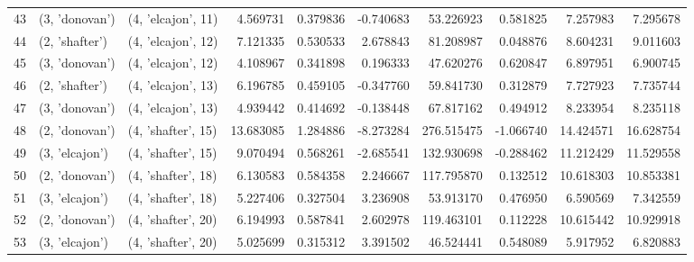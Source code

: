 \begin{tabular}{lllrrrrrrr}
43 &   (3, 'donovan') &  (4, 'elcajon', 11) &   4.569731 &   0.379836 & -0.740683 &    53.226923 &   0.581825 &   7.257983 &   7.295678 \\
44 &   (2, 'shafter') &  (4, 'elcajon', 12) &   7.121335 &   0.530533 &  2.678843 &    81.208987 &   0.048876 &   8.604231 &   9.011603 \\
45 &   (3, 'donovan') &  (4, 'elcajon', 12) &   4.108967 &   0.341898 &  0.196333 &    47.620276 &   0.620847 &   6.897951 &   6.900745 \\
46 &   (2, 'shafter') &  (4, 'elcajon', 13) &   6.196785 &   0.459105 & -0.347760 &    59.841730 &   0.312879 &   7.727923 &   7.735744 \\
47 &   (3, 'donovan') &  (4, 'elcajon', 13) &   4.939442 &   0.414692 & -0.138448 &    67.817162 &   0.494912 &   8.233954 &   8.235118 \\
48 &   (2, 'donovan') &  (4, 'shafter', 15) &  13.683085 &   1.284886 & -8.273284 &   276.515475 &  -1.066740 &  14.424571 &  16.628754 \\
49 &   (3, 'elcajon') &  (4, 'shafter', 15) &   9.070494 &   0.568261 & -2.685541 &   132.930698 &  -0.288462 &  11.212429 &  11.529558 \\
50 &   (2, 'donovan') &  (4, 'shafter', 18) &   6.130583 &   0.584358 &  2.246667 &   117.795870 &   0.132512 &  10.618303 &  10.853381 \\
51 &   (3, 'elcajon') &  (4, 'shafter', 18) &   5.227406 &   0.327504 &  3.236908 &    53.913170 &   0.476950 &   6.590569 &   7.342559 \\
52 &   (2, 'donovan') &  (4, 'shafter', 20) &   6.194993 &   0.587841 &  2.602978 &   119.463101 &   0.112228 &  10.615442 &  10.929918 \\
53 &   (3, 'elcajon') &  (4, 'shafter', 20) &   5.025699 &   0.315312 &  3.391502 &    46.524441 &   0.548089 &   5.917952 &   6.820883 \\
\bottomrule
\end{tabular}
